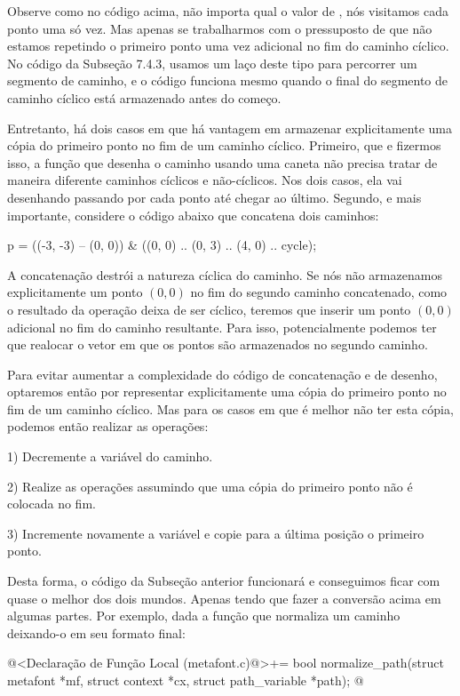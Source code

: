 Observe como no código acima, não importa qual o valor
de , nós visitamos cada ponto uma só vez. Mas apenas
se trabalharmos com o pressuposto de que não estamos repetindo o
primeiro ponto uma vez adicional no fim do caminho cíclico. No código
da Subseção 7.4.3, usamos um laço deste tipo para percorrer um
segmento de caminho, e o código funciona mesmo quando o final do
segmento de caminho cíclico está armazenado antes do começo.

Entretanto, há dois casos em que há vantagem em armazenar
explicitamente uma cópia do primeiro ponto no fim de um caminho
cíclico. Primeiro, que e fizermos isso, a função que desenha o caminho
usando uma caneta não precisa tratar de maneira diferente caminhos
cíclicos e não-cíclicos. Nos dois casos, ela vai desenhando passando
por cada ponto até chegar ao último. Segundo, e mais importante,
considere o código abaixo que concatena dois caminhos:

\alinhaverbatim
p = ((-3, -3) -- (0, 0)) & ((0, 0) .. (0, 3) .. (4, 0) .. cycle);
\alinhanormal

A concatenação destrói a natureza cíclica do caminho. Se nós não
armazenamos explicitamente um ponto $(0, 0)$ no fim do segundo caminho
concatenado, como o resultado da operação deixa de ser cíclico,
teremos que inserir um ponto $(0, 0)$ adicional no fim do caminho
resultante. Para isso, potencialmente podemos ter que realocar o vetor
em que os pontos são armazenados no segundo caminho.

Para evitar aumentar a complexidade do código de concatenação e de
desenho, optaremos então por representar explicitamente uma cópia do
primeiro ponto no fim de um caminho cíclico. Mas para os casos em que
é melhor não ter esta cópia, podemos então realizar as operações:

1) Decremente a variável  do caminho.

2) Realize as operações assumindo que uma cópia do primeiro ponto não
é colocada no fim.

3) Incremente novamente a variável  e copie para a
última posição o primeiro ponto.

Desta forma, o código da Subseção anterior funcionará e conseguimos
ficar com quase o melhor dos dois mundos. Apenas tendo que fazer a
conversão acima em algumas partes. Por exemplo, dada a função que
normaliza um caminho deixando-o em seu formato final:

\iniciocodigo
@<Declaração de Função Local (metafont.c)@>+=
bool normalize_path(struct metafont *mf, struct context *cx,
                    struct path_variable *path);
@
\fimcodigo


